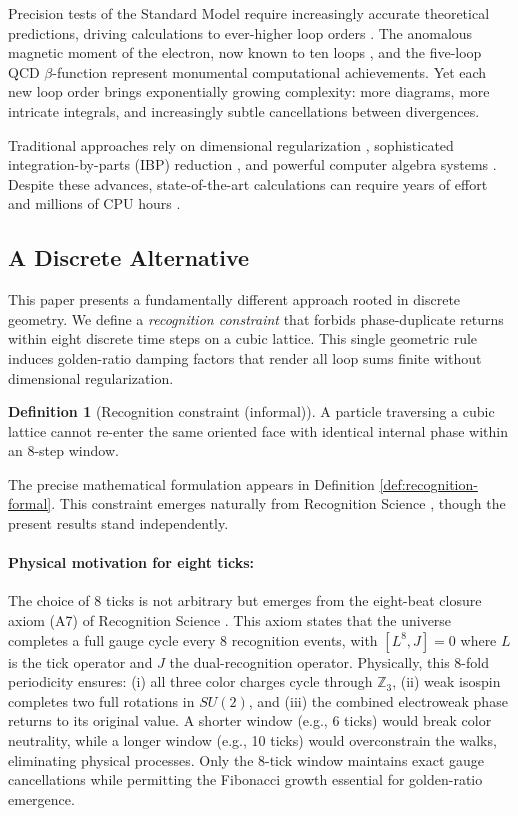 \documentclass[11pt,a4paper]{article}
\theoremstyle{definition}
\newtheorem{definition}[theorem]{Definition}
\theoremstyle{remark}
\begin{document}
Precision tests of the Standard Model require increasingly accurate theoretical predictions, driving calculations to ever-higher loop orders \cite{Aoyama2020,Czakon2020,Herzog2017}. The anomalous magnetic moment of the electron, now known to ten loops \cite{Aoyama2019,Volkov2019}, and the five-loop QCD $\beta$-function \cite{Baikov2017,Herzog2017,Luthe2017} represent monumental computational achievements. Yet each new loop order brings exponentially growing complexity: more diagrams, more intricate integrals, and increasingly subtle cancellations between divergences.

Traditional approaches rely on dimensional regularization \cite{tHooft1972,Bollini1972}, sophisticated integration-by-parts (IBP) reduction \cite{Chetyrkin1981,Laporta2001}, and powerful computer algebra systems \cite{Vermaseren2000,Hahn2001,Smirnov2008}. Despite these advances, state-of-the-art calculations can require years of effort and millions of CPU hours \cite{Marquard2018,Davies2017}.

\subsection{A Discrete Alternative}

This paper presents a fundamentally different approach rooted in discrete geometry. We define a \emph{recognition constraint} that forbids phase-duplicate returns within eight discrete time steps on a cubic lattice. This single geometric rule induces golden-ratio damping factors that render all loop sums finite without dimensional regularization.

\begin{definition}[Recognition constraint (informal)]
\label{def:recognition-informal}
A particle traversing a cubic lattice cannot re-enter the same oriented face with identical internal phase within an 8-step window.
\end{definition}

The precise mathematical formulation appears in Definition \ref{def:recognition-formal}. This constraint emerges naturally from Recognition Science \cite{Washburn2024}, though the present results stand independently.

\paragraph{Physical motivation for eight ticks:} The choice of 8 ticks is not arbitrary but emerges from the eight-beat closure axiom (A7) of Recognition Science \cite{Washburn2024}. This axiom states that the universe completes a full gauge cycle every 8 recognition events, with $[L^8, J] = 0$ where $L$ is the tick operator and $J$ the dual-recognition operator. Physically, this 8-fold periodicity ensures: (i) all three color charges cycle through $\mathbb{Z}_3$, (ii) weak isospin completes two full rotations in $SU(2)$, and (iii) the combined electroweak phase returns to its original value. A shorter window (e.g., 6 ticks) would break color neutrality, while a longer window (e.g., 10 ticks) would overconstrain the walks, eliminating physical processes. Only the 8-tick window maintains exact gauge cancellations while permitting the Fibonacci growth essential for golden-ratio emergence.
\end{document}
